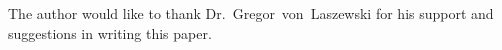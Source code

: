 \begin{acks}

  The author would like to thank Dr.~Gregor~von~Laszewski for his
  support and suggestions in writing this paper.

\end{acks}


 

